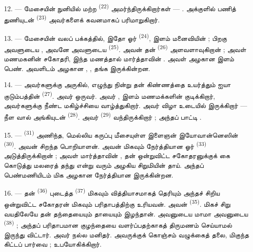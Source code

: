 12. --- மேசையின் நுனியில் மற்ற 
\textsuperscript{(22)} அமர்ந்திருக்கிறார்கள் — . அக்குளில்
பணித் துணியுடன்  \textsuperscript{(23)}
அவர்களைக் கவனமாகப் பரிமாறுகிறார்.

\VUsaut{3.0mm}

13. --- மேசையின் வலப் பக்கத்தில், இதோ ஓர் 
\textsuperscript{(24)}, இளம் மனைவியின்  ; பிறகு அவளுடைய
, அவனே அவளுடைய 
\textsuperscript{(25)}. அவன் தன் 
\textsuperscript{(26)} அளவளாவுகிறான் ; அவள் மணமகனின் சகோதரி, இந்த மணத்தால்
மார்த்தாவின் . அவள் அழகான இளம் பெண். அவளிடம்
அழகான , , தங்க  இருக்கின்றன.

14. --- அவர்களுக்கு அருகில், எழுந்து நின்று தன் கிண்ணத்தை உயர்த்தும் ஐயா
குடும்பத்தின்  \textsuperscript{(27)}. அவர்  ஒருவர். அவர் , இளம் மணமக்களின்
 குடிக்கிறார், அவர்களுக்கு நீண்ட மகிழ்ச்சியை
வாழ்த்துகிறார். அவர் விழா உடையில் இருக்கிறார் — நீள வால் அங்கியுடன்
 \textsuperscript{(28)}. அவர் 
\textsuperscript{(29)} வந்திருக்கிறார் ; அந்தப் பாட்டி .

15. ---  \textsuperscript{(31)} அணிந்த, மெல்லிய கருப்பு
மீசையுள்ள இளைஞன் இயோவான்னெஸின்  \textsuperscript{(30)}. அவன்
சிறந்த பொறியாளன். அவன் மிகவும் நேர்த்தியான ஓர் 
\textsuperscript{(33)} அடுத்திருக்கிறான் ; அவள் மார்த்தாவின் , தன் ஒன்றுவிட்ட சகோதரனுக்குக் கை கொடுத்து மலரைத் தந்து
 என்று  வரும் அழகிய சிறுமியின் தாய்.
அந்தப் பெண்மணியிடம் மிக அழகான  நேர்த்தியான  இருக்கின்றன.

16. --- தன்  \textsuperscript{(36)} புடைத்த
 \textsuperscript{(37)} மிகவும் வித்தியாசமாகத்
தெரியும் அந்தச் சிறிய ஒன்றுவிட்ட சகோதரன் மிகவும் பரிதாபத்திற்கு உரியவன்.
அவன்  \textsuperscript{(35)}. மிகச் சிறு வயதிலேயே தன் தந்தையையும்
தாயையும் இழந்தான். அவனுடைய மாமா அவனுடைய 
\textsuperscript{(38)} ; அந்தப் பரிதாபமான குழந்தையை வளர்ப்பதற்காகத் திருமணம்
செய்யாமல் இருந்து விட்டார். அவர் நல்ல மனிதர். அவருக்குக் கொஞ்சம் வழுக்கைத்
தலை, மிகுந்த கிட்டப் பார்வை ;  உபயோகிக்கிறார்.

